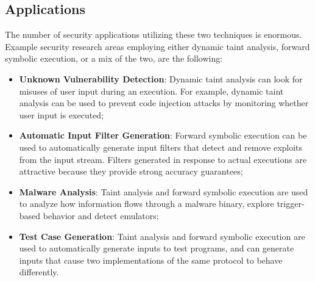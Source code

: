 \subsection{Applications}
The number of security applications utilizing these two techniques is enormous. Example security research areas employing either dynamic taint analysis, forward symbolic execution, or a mix of the two, are the following:
\begin{itemize}
	\item \textbf{Unknown Vulnerability Detection}: Dynamic taint analysis can look for misuses of user input during an execution. For example, dynamic taint analysis can be used to prevent code injection attacks by monitoring whether user input is executed;
	\item \textbf{Automatic Input Filter Generation}: Forward symbolic 	execution can be used to automatically generate input filters that detect and remove exploits from the input stream. Filters generated in response to actual executions are attractive because they provide strong accuracy guarantees;
	\item \textbf{Malware Analysis}: Taint analysis and forward symbolic execution are used to analyze how information flows through a malware binary, explore trigger-based behavior and detect emulators;
	\item \textbf{Test Case Generation}: Taint analysis and forward symbolic execution are used to automatically generate inputs to test programs, and can generate inputs that cause two implementations of the same protocol to behave differently.
\end{itemize}
